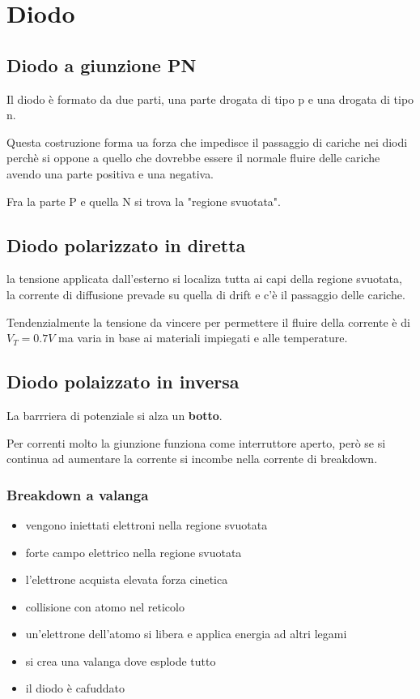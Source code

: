 \section{Diodo}
\subsection{Diodo a giunzione PN}

Il diodo è formato da due parti, una parte drogata di tipo p e una drogata di tipo n.

Questa costruzione forma ua forza che impedisce il passaggio di cariche nei diodi perchè si oppone 
a quello che dovrebbe essere il normale fluire delle  cariche avendo una parte positiva e una negativa.

Fra la parte P e quella N si trova la "regione svuotata".

\subsection{Diodo polarizzato in diretta}

la tensione applicata dall'esterno si localiza tutta ai capi della regione svuotata, la corrente di diffusione prevade su quella di drift e c'è il passaggio delle cariche.


Tendenzialmente la tensione da vincere per permettere il fluire della corrente è di $V_T = 0.7V$ ma varia in base ai materiali impiegati e alle temperature.

\subsection{Diodo polaizzato in inversa}


La barrriera di potenziale si alza un \textbf{botto}.

Per correnti molto la giunzione funziona come interruttore aperto, però se si continua ad
aumentare la corrente si incombe nella corrente di breakdown.

\subsubsection{Breakdown a valanga}
\begin{itemize}
    \item vengono iniettati elettroni nella regione svuotata
    \item forte campo elettrico nella regione svuotata
    \item l'elettrone acquista elevata forza cinetica
    \item collisione con atomo nel reticolo
    \item un'elettrone dell'atomo si libera e applica energia ad altri legami
    \item si crea una valanga dove esplode tutto
    \item il diodo è cafuddato
\end{itemize}

